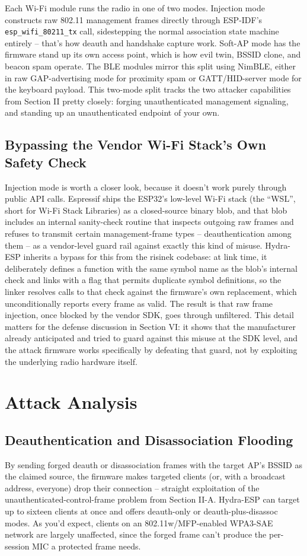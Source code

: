\documentclass[conference]{IEEEtran}
\begin{document}
Each Wi-Fi module runs the radio in one of two modes. Injection mode constructs raw 802.11 management frames directly through ESP-IDF's \texttt{esp\_wifi\_80211\_tx} call, sidestepping the normal association state machine entirely -- that's how deauth and handshake capture work. Soft-AP mode has the firmware stand up its own access point, which is how evil twin, BSSID clone, and beacon spam operate. The BLE modules mirror this split using NimBLE, either in raw GAP-advertising mode for proximity spam or GATT/HID-server mode for the keyboard payload. This two-mode split tracks the two attacker capabilities from Section II pretty closely: forging unauthenticated management signaling, and standing up an unauthenticated endpoint of your own.

\subsection{Bypassing the Vendor Wi-Fi Stack's Own Safety Check}
Injection mode is worth a closer look, because it doesn't work purely through public API calls. Espressif ships the ESP32's low-level Wi-Fi stack (the ``WSL'', short for Wi-Fi Stack Libraries) as a closed-source binary blob, and that blob includes an internal sanity-check routine that inspects outgoing raw frames and refuses to transmit certain management-frame types -- deauthentication among them -- as a vendor-level guard rail against exactly this kind of misuse. Hydra-ESP inherits a bypass for this from the risinek codebase: at link time, it deliberately defines a function with the same symbol name as the blob's internal check and links with a flag that permits duplicate symbol definitions, so the linker resolves calls to that check against the firmware's own replacement, which unconditionally reports every frame as valid. The result is that raw frame injection, once blocked by the vendor SDK, goes through unfiltered. This detail matters for the defense discussion in Section VI: it shows that the manufacturer already anticipated and tried to guard against this misuse at the SDK level, and the attack firmware works specifically by defeating that guard, not by exploiting the underlying radio hardware itself.

\section{Attack Analysis}

\subsection{Deauthentication and Disassociation Flooding}
By sending forged deauth or disassociation frames with the target AP's BSSID as the claimed source, the firmware makes targeted clients (or, with a broadcast address, everyone) drop their connection -- straight exploitation of the unauthenticated-control-frame problem from Section II-A. Hydra-ESP can target up to sixteen clients at once and offers deauth-only or deauth-plus-disassoc modes. As you'd expect, clients on an 802.11w/MFP-enabled WPA3-SAE network are largely unaffected, since the forged frame can't produce the per-session MIC a protected frame needs.
\end{document}
